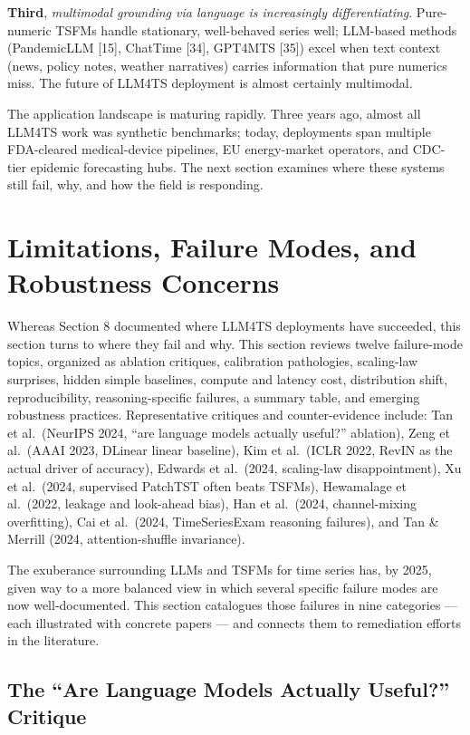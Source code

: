 \textbf{Third}, \emph{multimodal grounding via language is increasingly differentiating}. Pure-numeric TSFMs handle stationary, well-behaved series well; LLM-based methods (PandemicLLM {[}15{]}, ChatTime {[}34{]}, GPT4MTS {[}35{]}) excel when text context (news, policy notes, weather narratives) carries information that pure numerics miss. The future of LLM4TS deployment is almost certainly multimodal.

The application landscape is maturing rapidly. Three years ago, almost all LLM4TS work was synthetic benchmarks; today, deployments span multiple FDA-cleared medical-device pipelines, EU energy-market operators, and CDC-tier epidemic forecasting hubs. The next section examines where these systems still fail, why, and how the field is responding.

\section{Limitations, Failure Modes, and Robustness Concerns}\label{limitations-failure-modes-and-robustness-concerns}

Whereas Section 8 documented where LLM4TS deployments have succeeded, this section turns to where they fail and why. This section reviews twelve failure-mode topics, organized as ablation critiques, calibration pathologies, scaling-law surprises, hidden simple baselines, compute and latency cost, distribution shift, reproducibility, reasoning-specific failures, a summary table, and emerging robustness practices. Representative critiques and counter-evidence include: Tan et al.~(NeurIPS 2024, ``are language models actually useful?'' ablation), Zeng et al.~(AAAI 2023, DLinear linear baseline), Kim et al.~(ICLR 2022, RevIN as the actual driver of accuracy), Edwards et al.~(2024, scaling-law disappointment), Xu et al.~(2024, supervised PatchTST often beats TSFMs), Hewamalage et al.~(2022, leakage and look-ahead bias), Han et al.~(2024, channel-mixing overfitting), Cai et al.~(2024, TimeSeriesExam reasoning failures), and Tan \& Merrill (2024, attention-shuffle invariance).

The exuberance surrounding LLMs and TSFMs for time series has, by 2025, given way to a more balanced view in which several specific failure modes are now well-documented. This section catalogues those failures in nine categories --- each illustrated with concrete papers --- and connects them to remediation efforts in the literature.

\subsection{The ``Are Language Models Actually Useful?'' Critique}\label{the-are-language-models-actually-useful-critique}

